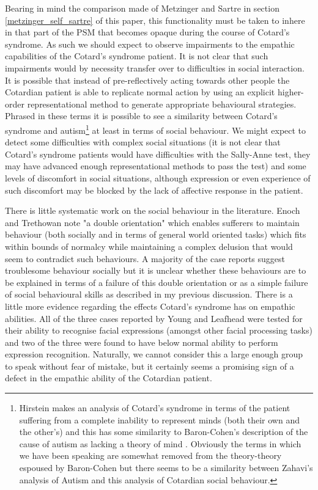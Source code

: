 Bearing in mind the comparison made of Metzinger and Sartre in section \ref{metzinger_self_sartre} of this paper, this functionality must be taken to inhere in that part of the PSM that becomes opaque during the course of Cotard's syndrome. As such we should expect to observe impairments to the empathic capabilities of the Cotard's syndrome patient. It is not clear that such impairments would by necessity transfer over to difficulties in social interaction. It is possible that instead of pre-reflectively acting towards other people the Cotardian patient is able to replicate normal action by
using an explicit higher-order representational method to generate appropriate behavioural strategies. Phrased in these terms it is possible to see a similarity between Cotard's syndrome and autism\footnote{Hirstein makes an analysis of Cotard's syndrome in terms of the patient suffering from a complete inability to represent minds (both their own and the other's) \cite[p. 127]{hirstein2005} and this has some similarity to Baron-Cohen's description of the cause of autism as lacking a theory of mind \cite{baron1985autistic}. Obviously the terms in which we have been speaking are somewhat removed from the theory-theory espoused by Baron-Cohen but there seems to be a similarity between Zahavi's \cite[P. 218]{zahavi2005} analysis of Autism and this analysis of Cotardian social behaviour.} at least in terms of social behaviour. We might expect to detect some difficulties with complex social situations (it is not clear that Cotard's syndrome patients would have difficulties with the Sally-Anne test, they may have advanced enough representational methods to pass the test) and some levels of discomfort in social situations, although expression or even experience of such discomfort may be blocked by the lack of affective response in the patient.

There is little systematic work on the social behaviour in the literature. Enoch and Trethowan note "a double orientation" \cite[p. 159]{enoch1991} which enables sufferers to maintain behaviour (both socially and in terms of general world oriented tasks) which fits within bounds of normalcy while maintaining a complex delusion that would seem to contradict such behaviours. A majority of the case reports suggest troublesome behaviour socially but it is unclear whether these behaviours are to be explained in terms of a failure of this double orientation or as a simple failure of social behavioural skills as described in my previous discussion. There is a little more evidence regarding the effects Cotard's syndrome has on empathic abilities. All of the three cases reported by Young and Leafhead were tested for their ability to recognise facial expressions (amongst other facial processing tasks) and two of the three were found to have below normal ability to perform expression recognition. Naturally, we cannot consider this a large enough group to speak without fear of mistake, but it certainly seems a promising sign of a defect in the empathic ability of the Cotardian patient.

